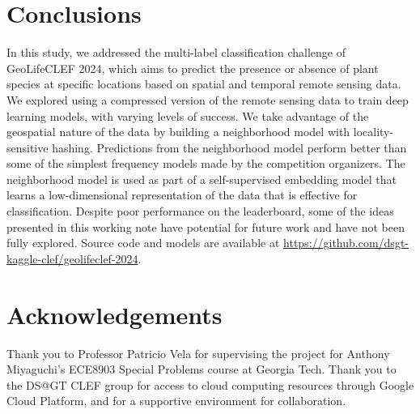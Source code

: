 \section{Conclusions}

In this study, we addressed the multi-label classification challenge of GeoLifeCLEF 2024, which aims to predict the presence or absence of plant species at specific locations based on spatial and temporal remote sensing data. 
We explored using a compressed version of the remote sensing data to train deep learning models, with varying levels of success.
We take advantage of the geospatial nature of the data by building a neighborhood model with locality-sensitive hashing.
Predictions from the neighborhood model perform better than some of the simplest frequency models made by the competition organizers.
The neighborhood model is used as part of a self-supervised embedding model that learns a low-dimensional representation of the data that is effective for classification.
Despite poor performance on the leaderboard, some of the ideas presented in this working note have potential for future work and have not been fully explored.
Source code and models are available at \url{https://github.com/dsgt-kaggle-clef/geolifeclef-2024}.

\section*{Acknowledgements}

Thank you to Professor Patricio Vela for supervising the project for Anthony Miyaguchi's ECE8903 Special Problems course at Georgia Tech.
Thank you to the DS@GT CLEF group for access to cloud computing resources through Google Cloud Platform, and for a supportive environment for collaboration.